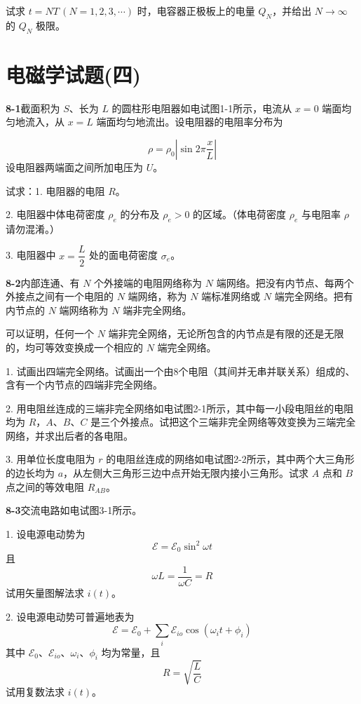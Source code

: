 试求 $t = NT\,(N = 1, 2, 3, \cdots)$ 时，电容器正极板上的电量 $Q_{N}$，并给出 $N \to \infty$ 的 $Q_{N}$ 极限。

\vfill


\section*{电磁学试题(四)}
\vfill

\newpage
\textbf{8-1}\quad 截面积为 $S$、长为 $L$ 的圆柱形电阻器如电试图1-1所示，电流从 $x = 0$ 端面均匀地流入，从 $x = L$ 端面均匀地流出。设电阻器的电阻率分布为


$$
\rho = \rho_{0}\left|\sin 2\pi\frac{x}{L}\right|
$$
设电阻器两端面之间所加电压为 $U$。

试求：1. 电阻器的电阻 $R$。

2. 电阻器中体电荷密度 $\rho_{e}$ 的分布及 $\rho_{e} > 0$ 的区域。（体电荷密度 $\rho_{e}$ 与电阻率 $\rho$ 请勿混淆。）

3. 电阻器中 $x = \dfrac{L}{2}$ 处的面电荷密度 $\sigma_{e}$。
\vfill

\textbf{8-2}\quad 内部连通、有 $N$ 个外接端的电阻网络称为 $N$ 端网络。把没有内节点、每两个外接点之间有一个电阻的 $N$ 端网络，称为 $N$ 端标准网络或 $N$ 端完全网络。把有内节点的 $N$ 端网络称为 $N$ 端非完全网络。

可以证明，任何一个 $N$ 端非完全网络，无论所包含的内节点是有限的还是无限的，均可等效变换成一个相应的 $N$ 端完全网络。

1. 试画出四端完全网络。试画出一个由8个电阻（其间并无串并联关系）组成的、含有一个内节点的四端非完全网络。

2. 用电阻丝连成的三端非完全网络如电试图2-1所示，其中每一小段电阻丝的电阻均为 $R$，$A$、$B$、$C$ 是三个外接点。试把这个三端非完全网络等效变换为三端完全网络，并求出后者的各电阻。


3. 用单位长度电阻为 $r$ 的电阻丝连成的网络如电试图2-2所示，其中两个大三角形的边长均为 $a$，从左侧大三角形三边中点开始无限内接小三角形。试求 $A$ 点和 $B$ 点之间的等效电阻 $R_{AB}$。
\vfill

\newpage
\textbf{8-3}\quad 交流电路如电试图3-1所示。


1. 设电源电动势为
$$
\mathcal{E} = \mathcal{E}_{0}\sin^{2}\omega t
$$
且
$$
\omega L = \frac{1}{\omega C} = R
$$
试用矢量图解法求 $i(t)$。

2. 设电源电动势可普遍地表为
$$
\mathcal{E} = \mathcal{E}_{0} + \sum_{i} \mathcal{E}_{io}\cos(\omega_{i}t + \phi_{i})
$$
其中 $\mathcal{E}_{0}$、$\mathcal{E}_{io}$、$\omega_{i}$、$\phi_{i}$ 均为常量，且
$$
R = \sqrt{\frac{L}{C}}
$$
试用复数法求 $i(t)$。
\vfill

